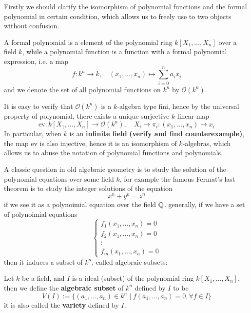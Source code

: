 Firstly we should clarify the isomorphism of polynomial functions and the formal polynomial in certain condition, which allows us to freely use to two objects without confusion.
\begin{definition}
    A formal polynomial is a element of the polynomial ring \(k[X_1,\dots,X_n]\) over a field \(k\), while a polynomial function is a function with a formal polynomial expression, i.e. a map
    \[f: k^n \to k, \quad (x_1,...,x_n) \mapsto \sum_{i=0}^{n}a_i x_i\]
    and we denote the set of all polynomial functions on \(k^n\) by \(\mathcal{O}(k^n)\).\\
\end{definition}

It is easy to verify that \(\mathcal{O}(k^n)\) is a \(k\)-algebra type fini, hence by the universal property of polynomial, there exists a unique surjective \(k\)-linear map
\[\mathrm{ev}:k[X_1,\dots,X_n] \to \mathcal{O}(k^n), \quad X_i \mapsto \pi_i: (x_1,...,x_n) \mapsto x_i\]
In particular, when \(k\) is an \textbf{infinite field}\textbf{ (verify and find counterexample)}, the map \(\mathrm{ev}\) is also injective, hence it is an isomorphism of \(k\)-algebras, which allows us to abuse the notation of polynomial functions and polynomials.

A classic question in old algebraic geometry is to study the solution of the polynomial equations over some field \(k\), for example the famous Fermat's last theorem is to study the integer solutions of the equation
\[x^n + y^n = z^n\]
if we see it as a polynoimial equation over the field \(\mathbb{Q}\). generally, if we have a set of polynoimial equations
\begin{equation}\label{eq:poly-equations}
    \begin{cases}
    f_1(x_1,\dots,x_n) = 0\\
    f_2(x_1,\dots,x_n) = 0\\
    \vdots \\
    f_m(x_1,\dots,x_n) = 0
    \end{cases}
\end{equation}
then it induces a subset of \(k^n\), called algebraic subsets:
\begin{definition}
    Let \(k\) be a field, and \(I\) is a ideal (subset) of the polynomial ring \(k[X_1,\dots,X_n]\), then we define the \textbf{algebraic subset} of \(k^n\) defined by \(I\) to be
    \[V(I) := \{(a_1,\dots,a_n) \in k^n \mid f(a_1,\dots,a_n) = 0, \forall f \in I\}\]
    it is also called the \textbf{variety} defined by \(I\).\\
\end{definition}

